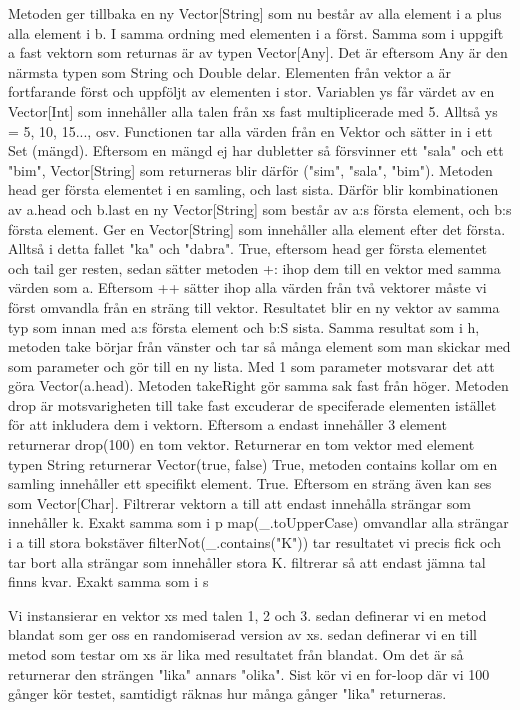 \Subtask 
Metoden ger tillbaka en ny Vector[String] som nu består av alla element i a plus alla element i b. I samma ordning med elementen i a först.
\Subtask 
Samma som i uppgift a fast vektorn som returnas är av typen Vector[Any]. Det är eftersom Any är den närmsta typen som String och Double delar. Elementen från vektor a är fortfarande först och uppföljt av elementen i stor.
\Subtask 
Variablen ys får värdet av en Vector[Int] som innehåller alla talen från xs fast multiplicerade med 5. Alltså ys = 5, 10, 15..., osv.
\Subtask 
Functionen tar alla värden från en Vektor och sätter in i ett Set (mängd). Eftersom en mängd ej har dubletter så försvinner ett "sala" och ett "bim", Vector[String] som returneras blir därför ("sim", "sala", "bim").
\Subtask 
Metoden head ger första elementet i en samling, och last sista. Därför blir kombinationen av a.head och b.last en ny Vector[String] som består av a:s första element, och b:s första element.
\Subtask 
Ger en Vector[String] som innehåller alla element efter det första. Alltså i detta fallet "ka" och "dabra".
\Subtask 
True, eftersom head ger första elementet och tail ger resten, sedan sätter metoden +: ihop dem till en vektor med samma värden som a.
\Subtask 
Eftersom ++ sätter ihop alla värden från två vektorer måste vi först omvandla från en sträng till vektor. Resultatet blir en ny vektor av samma typ som innan med a:s första element och b:S sista.
\Subtask 
Samma resultat som i h, metoden take börjar från vänster och tar så många element som man skickar med som parameter och gör till en ny lista. Med 1 som parameter motsvarar det att göra Vector(a.head). Metoden takeRight gör samma sak fast från höger.
\Subtask 
Metoden drop är motsvarigheten till take fast excuderar de speciferade elementen istället för att inkludera dem i vektorn.
\Subtask 
Eftersom a endast innehåller 3 element returnerar drop(100) en tom vektor.
\Subtask 
Returnerar en tom vektor med element typen String
\Subtask 
returnerar Vector(true, false) 
\Subtask 
True, metoden contains kollar om en samling innehåller ett specifikt element.
\Subtask 
True. Eftersom en sträng även kan ses som Vector[Char].
\Subtask 
Filtrerar vektorn a till att endast innehålla strängar som innehåller k.
\Subtask 
Exakt samma som i p
\Subtask 
map(\_.toUpperCase) omvandlar alla strängar i a till stora bokstäver
filterNot(\_.contains("K")) tar resultatet vi precis fick och tar bort alla strängar som innehåller stora K.
\Subtask 
filtrerar så att endast jämna tal finns kvar.
\Subtask 
Exakt samma som i s

\Task %
\Subtask 
Vi instansierar en vektor xs med talen 1, 2 och 3.
sedan definerar vi en metod blandat som ger oss en randomiserad version av xs.
sedan definerar vi en till metod som testar om xs är lika med resultatet från blandat. Om det är så returnerar den strängen "lika" annars "olika".
Sist kör vi en for-loop där vi 100 gånger kör testet, samtidigt räknas hur många gånger "lika" returneras.

